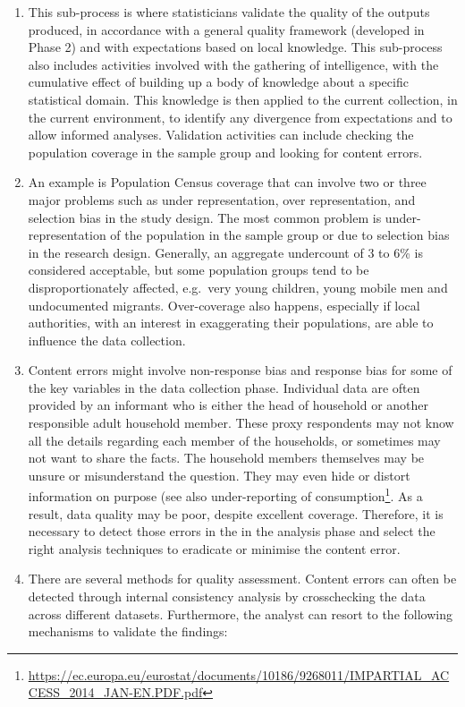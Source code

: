 \documentclass[
]{article}
\begin{document}
\begin{enumerate}
\def\labelenumi{\arabic{enumi}.}
\setcounter{enumi}{459}
\item
  This sub-process is where statisticians validate the quality of the
  outputs produced, in accordance with a general quality framework
  (developed in Phase 2) and with expectations based on local
  knowledge. This sub-process also includes activities involved with
  the gathering of intelligence, with the cumulative effect of
  building up a body of knowledge about a specific statistical domain.
  This knowledge is then applied to the current collection, in the
  current environment, to identify any divergence from expectations
  and to allow informed analyses. Validation activities can include
  checking the population coverage in the sample group and looking for
  content errors.
\item
  An example is Population Census coverage that can involve two or
  three major problems such as under representation, over
  representation, and selection bias in the study design. The most
  common problem is under-representation of the population in the
  sample group or due to selection bias in the research design.
  Generally, an aggregate undercount of 3 to 6\% is considered
  acceptable, but some population groups tend to be disproportionately
  affected, e.g.~very young children, young mobile men and
  undocumented migrants. Over-coverage also happens, especially if
  local authorities, with an interest in exaggerating their
  populations, are able to influence the data collection.
\item
  Content errors might involve non-response bias and response bias
  for some of the key variables in the data collection phase.
  Individual data are often provided by an informant who is either the
  head of household or another responsible adult household member.
  These proxy respondents may not know all the details regarding each
  member of the households, or sometimes may not want to share the
  facts. The household members themselves may be unsure or
  misunderstand the question. They may even hide or distort
  information on purpose (see also under-reporting of
  consumption\footnote{\url{https://ec.europa.eu/eurostat/documents/10186/9268011/IMPARTIAL_ACCESS_2014_JAN-EN.PDF.pdf}}. As a result, data quality may be poor, despite
  excellent coverage. Therefore, it is necessary to detect those
  errors in the in the analysis phase and select the right analysis
  techniques to eradicate or minimise the content error.
\item
  There are several methods for quality assessment. Content errors
  can often be detected through internal consistency analysis by
  crosschecking the data across different datasets. Furthermore, the
  analyst can resort to the following mechanisms to validate the
  findings:
\end{enumerate}
\end{document}
